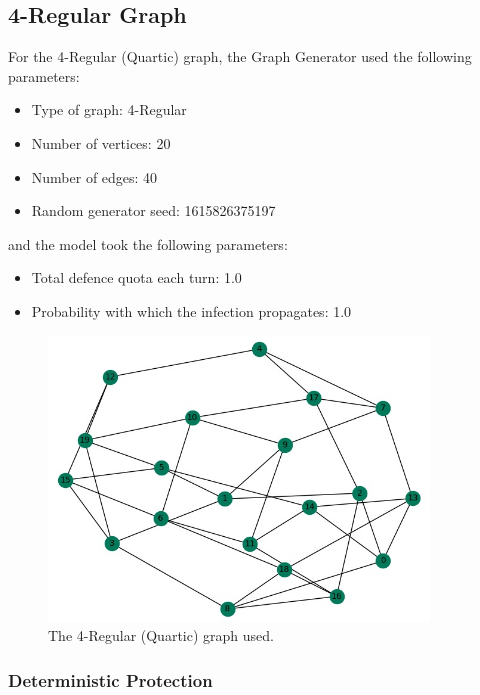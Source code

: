 \documentclass[results.tex]{subfiles}
\begin{document}
\newpage

\subsection{4-Regular Graph}

For the 4-Regular (Quartic) graph, the Graph Generator used the following parameters:

\begin{itemize}
\item Type of graph: 4-Regular
\item Number of vertices: 20
\item Number of edges: 40
\item Random generator seed: 1615826375197
\end{itemize}
and the model took the following parameters:
\begin{itemize}
\item Total defence quota each turn: 1.0
\item Probability with which the infection propagates: 1.0
\end{itemize}

\begin{figure}[!ht]
	\centering
	\includegraphics[width=0.9\textwidth]{4regular.jpg}
	\caption{The 4-Regular (Quartic) graph used.}
	\label{fig:4reg}
\end{figure}

\subsubsection{Deterministic Protection}


\end{document}
